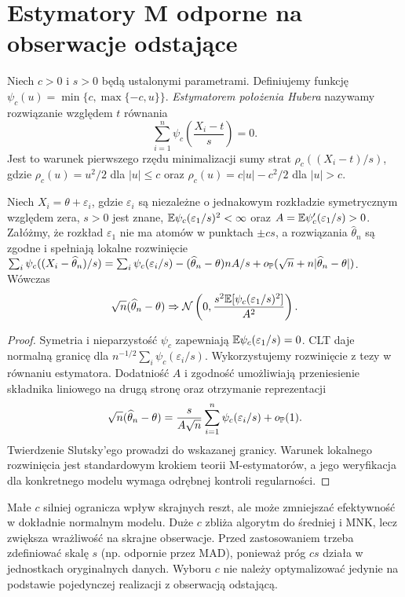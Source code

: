 \section{Estymatory M odporne na obserwacje odstające}
\begin{definicja}
\label{def:huber}
Niech $c>0$ i $s>0$ będą ustalonymi parametrami.
Definiujemy funkcję
$\psi_c(u)=\min\{c,\max\{-c,u\}\}$.
\emph{Estymatorem położenia Hubera} nazywamy rozwiązanie
względem $t$ równania
\[
 \sum_{i=1}^n\psi_c\left(\frac{X_i-t}{s}\right)=0.
\]
Jest to warunek pierwszego rzędu minimalizacji
sumy strat $\rho_c((X_i-t)/s)$, gdzie
$\rho_c(u)=u^2/2$ dla $|u|\le c$ oraz
$\rho_c(u)=c|u|-c^2/2$ dla $|u|>c$.
\end{definicja}

\begin{stwierdzenie}
\label{prop:huber-asympt}
Niech $X_i=\theta+\varepsilon_i$, gdzie $\varepsilon_i$
są niezależne o jednakowym rozkładzie symetrycznym
względem zera, $s>0$ jest znane,
$\mathbb E\psi_c(\varepsilon_1/s)^2<\infty$ oraz
$A=\mathbb E\psi_c'(\varepsilon_1/s)>0$.
Załóżmy, że rozkład $\varepsilon_1$ nie ma atomów
w punktach $\pm cs$, a rozwiązania $\widehat\theta_n$
są zgodne i spełniają lokalne rozwinięcie
$\sum_i\psi_c((X_i-\widehat\theta_n)/s)
=\sum_i\psi_c(\varepsilon_i/s)
-(\widehat\theta_n-\theta) n A/s
+o_\mathbb P(\sqrt n+ n|\widehat\theta_n-\theta|)$.
Wówczas
\[
 \sqrt n(\widehat\theta_n-\theta)
 \Rightarrow\mathcal N\left(0,
 \frac{s^2\mathbb E[\psi_c(\varepsilon_1/s)^2]}{A^2}\right).
\]
\end{stwierdzenie}
\begin{proof}
Symetria i nieparzystość $\psi_c$ zapewniają
$\mathbb E\psi_c(\varepsilon_1/s)=0$.
CLT daje normalną granicę dla
$n^{-1/2}\sum_i\psi_c(\varepsilon_i/s)$.
Wykorzystujemy rozwinięcie z tezy w równaniu estymatora.
Dodatniość $A$ i zgodność umożliwiają przeniesienie
składnika liniowego na drugą stronę oraz otrzymanie
reprezentacji
\[
 \sqrt n(\widehat\theta_n-\theta)
 =\frac{s}{A\sqrt n}\sum_{i=1}^n
 \psi_c(\varepsilon_i/s)+o_\mathbb P(1).
\]
Twierdzenie Slutsky'ego prowadzi do wskazanej granicy.
Warunek lokalnego rozwinięcia jest standardowym krokiem
teorii M-estymatorów, a jego weryfikacja dla konkretnego
modelu wymaga odrębnej kontroli regularności.
\end{proof}

\begin{uwaga}
Małe $c$ silniej ogranicza wpływ skrajnych reszt,
ale może zmniejszać efektywność w dokładnie normalnym
modelu. Duże $c$ zbliża algorytm do średniej i MNK,
lecz zwiększa wrażliwość na skrajne obserwacje.
Przed zastosowaniem trzeba zdefiniować skalę $s$
(np. odpornie przez MAD), ponieważ próg $cs$ działa
w jednostkach oryginalnych danych. Wyboru $c$
nie należy optymalizować jedynie na podstawie
pojedynczej realizacji z obserwacją odstającą.
\end{uwaga}

